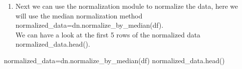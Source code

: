 \documentclass[
  letterpaper,
  DIV=11,
  numbers=noendperiod]{scrartcl}
\newenvironment{Shaded}{\begin{snugshade}}{\end{snugshade}}
\newcommand{\NormalTok}[1]{\textcolor[rgb]{0.00,0.23,0.31}{#1}}
\newcommand{\OperatorTok}[1]{\textcolor[rgb]{0.37,0.37,0.37}{#1}}
\providecommand{\tightlist}{%
  \setlength{\itemsep}{0pt}\setlength{\parskip}{0pt}}\usepackage{longtable,booktabs,array}
\begin{document}
\begin{enumerate}
\def\labelenumi{\arabic{enumi}.}
\setcounter{enumi}{1}
\tightlist
\item
  Next we can use the normalization module to normalize the data, here
  we will use the median normalization method
  normalized\_data=dn.normalize\_by\_median(df).\\
  We can have a look at the first 5 rows of the normalized data
  normalized\_data.head().\\
\end{enumerate}

\begin{Shaded}
\begin{Highlighting}[]
\NormalTok{normalized\_data}\OperatorTok{=}\NormalTok{dn.normalize\_by\_median(df)}
\NormalTok{normalized\_data.head()}
\end{Highlighting}
\end{Shaded}
\end{document}
